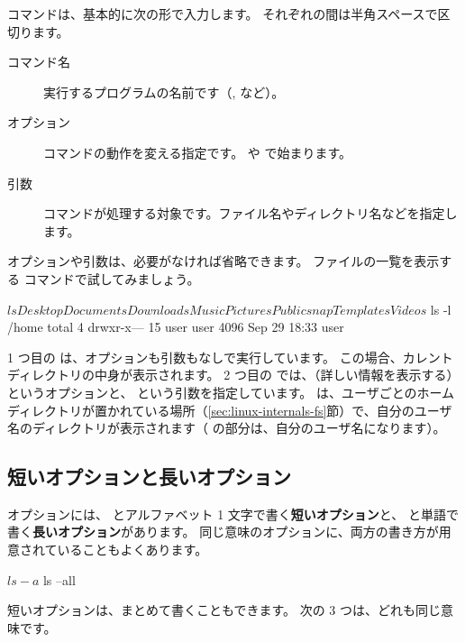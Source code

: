コマンドは、基本的に次の形で入力します。
それぞれの間は半角スペースで区切ります。

\begin{description}
  \item[コマンド名] 実行するプログラムの名前です（,  など）。
  \item[オプション] コマンドの動作を変える指定です。\cmd{-} や \cmd{--} で始まります。
  \item[引数] コマンドが処理する対象です。ファイル名やディレクトリ名などを指定します。
\end{description}

オプションや引数は、必要がなければ省略できます。
ファイルの一覧を表示する  コマンドで試してみましょう。

\begin{terminal}[オプションと引数]
$ ls
Desktop  Documents  Downloads  Music  Pictures  Public  snap  Templates  Videos
$ ls -l /home
total 4
drwxr-x--- 15 user user 4096 Sep 29 18:33 user
\end{terminal}

1 つ目の  は、オプションも引数もなしで実行しています。
この場合、カレントディレクトリの中身が表示されます。
2 つ目の  では、（詳しい情報を表示する）というオプションと、 という引数を指定しています。
 は、ユーザごとのホームディレクトリが置かれている場所（\ref{sec:linux-internals-fs}節）で、自分のユーザ名のディレクトリが表示されます（ の部分は、自分のユーザ名になります）。

\subsection{短いオプションと長いオプション}

オプションには、\cmd{-} とアルファベット 1 文字で書く\textbf{短いオプション}と、\cmd{--} と単語で書く\textbf{長いオプション}があります。
同じ意味のオプションに、両方の書き方が用意されていることもよくあります。

\begin{terminal}[同じ意味の短いオプションと長いオプション]
$ ls -a
$ ls --all
\end{terminal}

短いオプションは、まとめて書くこともできます。
次の 3 つは、どれも同じ意味です。

